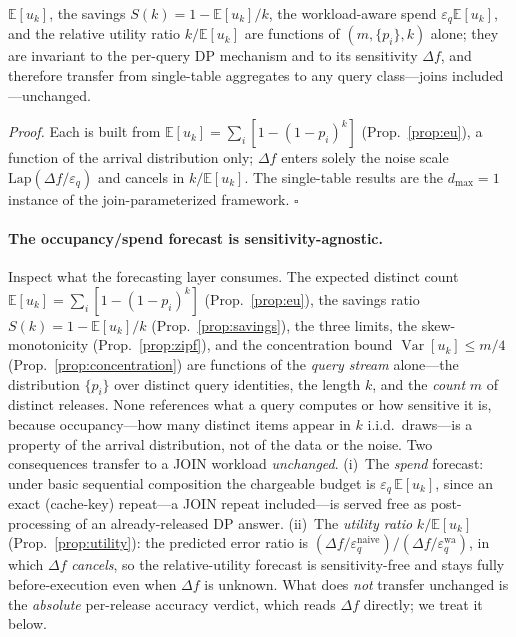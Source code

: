 \documentclass[sigconf,nonacm]{acmart}
\newcommand{\eps}{\varepsilon}
\newcommand{\E}{\mathbb{E}}
\newcommand{\Lap}{\mathrm{Lap}}
\DeclareMathOperator{\Var}{Var}
\begin{document}
\begin{proposition}
\label{prop:agnostic}
$\E[u_k]$, the savings $S(k)=1-\E[u_k]/k$, the workload-aware spend $\eps_q\E[u_k]$, and the relative utility ratio $k/\E[u_k]$ are functions of $(m,\{p_i\},k)$ alone; they are invariant to the per-query DP mechanism and to its sensitivity $\Delta f$, and therefore transfer from single-table aggregates to any query class---joins included---unchanged.
\end{proposition}
\noindent\emph{Proof.} Each is built from $\E[u_k]=\sum_i[1-(1-p_i)^k]$ (Prop.~\ref{prop:eu}), a function of the arrival distribution only; $\Delta f$ enters solely the noise scale $\Lap(\Delta f/\eps_q)$ and cancels in $k/\E[u_k]$. The single-table results are the $d_{\max}{=}1$ instance of the join-parameterized framework. \hfill$\square$

\paragraph{The occupancy/spend forecast is sensitivity-agnostic.}
Inspect what the forecasting layer consumes. The expected distinct count $\E[u_k]=\sum_i[1-(1-p_i)^k]$ (Prop.~\ref{prop:eu}), the savings ratio $S(k)=1-\E[u_k]/k$ (Prop.~\ref{prop:savings}), the three limits, the skew-monotonicity (Prop.~\ref{prop:zipf}), and the concentration bound $\Var[u_k]\le m/4$ (Prop.~\ref{prop:concentration}) are functions of the \emph{query stream} alone---the distribution $\{p_i\}$ over distinct query identities, the length $k$, and the \emph{count} $m$ of distinct releases. None references what a query computes or how sensitive it is, because occupancy---how many distinct items appear in $k$ i.i.d.\ draws---is a property of the arrival distribution, not of the data or the noise. Two consequences transfer to a JOIN workload \emph{unchanged}. (i)~The \emph{spend} forecast: under basic sequential composition the chargeable budget is $\eps_q\,\E[u_k]$, since an exact (cache-key) repeat---a JOIN repeat included---is served free as post-processing of an already-released DP answer. (ii)~The \emph{utility ratio} $k/\E[u_k]$ (Prop.~\ref{prop:utility}): the predicted error ratio is $(\Delta f/\eps_q^{\mathrm{naive}})/(\Delta f/\eps_q^{\mathrm{wa}})$, in which $\Delta f$ \emph{cancels}, so the relative-utility forecast is sensitivity-free and stays fully before-execution even when $\Delta f$ is unknown. What does \emph{not} transfer unchanged is the \emph{absolute} per-release accuracy verdict, which reads $\Delta f$ directly; we treat it below.
\end{document}
